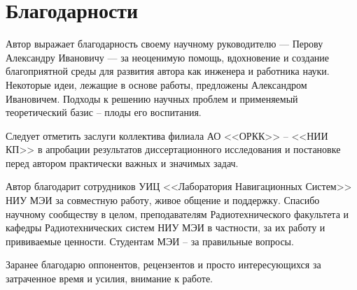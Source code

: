 \section*{Благодарности}

Автор выражает благодарность своему научному руководителю --- Перову Александру Ивановичу --- за неоценимую помощь, вдохновение и создание благоприятной среды для развития автора как инженера и работника науки.
Некоторые идеи, лежащие в основе работы, предложены Александром Ивановичем. Подходы к решению научных проблем и применяемый теоретический базис -- плоды его воспитания.

Следует отметить заслуги коллектива филиала АО <<ОРКК>> -- <<НИИ КП>> в апробации результатов диссертационного исследования и постановке перед автором практически важных и значимых задач. 

Автор благодарит сотрудников УИЦ <<Лаборатория Навигационных Систем>> НИУ МЭИ за совместную работу, живое общение и поддержку.
Спасибо научному сообществу в целом, преподавателям Радиотехнического факультета и кафедры Радиотехнических систем НИУ МЭИ в частности, за их работу и прививаемые ценности.
Студентам МЭИ -- за правильные вопросы. 

Заранее благодарю оппонентов, рецензентов и просто интересующихся за затраченное время и усилия, внимание к работе.
